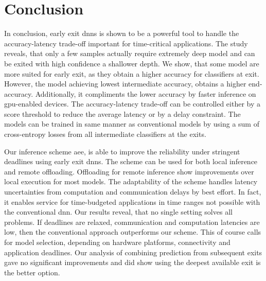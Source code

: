 \hypertarget{conclusion}{%
\chapter{Conclusion}\label{ch:conclusion}}


In conclusion, early exit \gls{dnn}s is shown to be a powerful tool to handle the accuracy-latency trade-off important for time-critical applications. The study reveals, that only a few samples actually require extremely deep model and can be exited with high confidence a shallower depth. We show, that some model are more suited for early exit, as they obtain a higher accuracy for classifiers at exit. However, the model achieving lowest intermediate accuracy, obtains a higher end-accuracy. Additionally, it compliments the lower accuracy by faster inference on \gls{gpu}-enabled devices. The accuracy-latency trade-off can be controlled either by a score threshold to reduce the average latency or by a delay constraint. The models can be trained in same manner as conventional models by using a sum of cross-entropy losses from all intermediate classifiers at the exits.

Our inference scheme \gls{aee}, is able to improve the reliability under stringent deadlines using early exit \gls{dnn}s. The scheme can be used for both local inference and remote offloading. Offloading for remote inference show improvements over local execution for most models. The adaptability of the scheme handles latency uncertainties from computation and communication delays by best effort. In fact, it enables service for time-budgeted applications in time ranges not possible with the conventional \gls{dnn}. Our results reveal, that no single setting solves all problems. If deadlines are relaxed, communication and computation latencies are low, then the conventional approach outperforms our scheme. This of course calls for model selection, depending on hardware platforms, connectivity and application deadlines. Our analysis of combining prediction from subsequent exits gave no significant improvements and did show using the deepest available exit is the better option.


